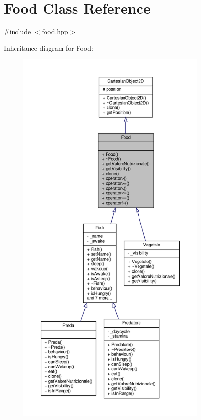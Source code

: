 \hypertarget{classFood}{}\section{Food Class Reference}
\label{classFood}


{\ttfamily \#include $<$food.\+hpp$>$}



Inheritance diagram for Food\+:\nopagebreak
\begin{figure}[H]
\begin{center}
\leavevmode
\includegraphics[height=550pt]{classFood__inherit__graph}
\end{center}
\end{figure}


